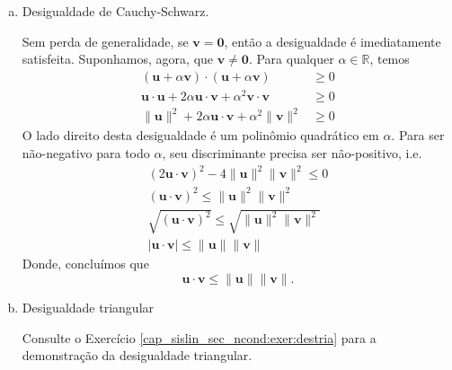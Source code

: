 \begin{dem}
\begin{enumerate}[a)]
  \item Desigualdade de Cauchy-Schwarz.

    Sem perda de generalidade, se $\pmb{v} = \pmb{0}$, então a desigualdade é imediatamente satisfeita. Suponhamos, agora, que $\pmb{v}\neq\pmb{0}$. Para qualquer $\alpha\in\mathbb{R}$, temos
    \begin{align}
      (\pmb{u}+\alpha\pmb{v})\cdot(\pmb{u}+\alpha\pmb{v}) &\geq 0\\
      \pmb{u}\cdot\pmb{u} + 2\alpha\pmb{u}\cdot\pmb{v} + \alpha^2\pmb{v}\cdot\pmb{v} &\geq 0\\
      \|\pmb{u}\|^2 + 2\alpha\pmb{u}\cdot\pmb{v} + \alpha^2\|\pmb{v}\|^2 &\geq 0
    \end{align}
    O lado direito desta desigualdade é um polinômio quadrático em $\alpha$. Para ser não-negativo para todo $\alpha$, seu discriminante precisa ser não-positivo, i.e.
    \begin{gather}
      (2\pmb{u}\cdot\pmb{v})^2 - 4\|\pmb{u}\|^2\|\pmb{v}\|^2 \leq 0\\
      (\pmb{u}\cdot\pmb{v})^2 \leq \|\pmb{u}\|^2\|\pmb{v}\|^2\\
      \sqrt{(\pmb{u}\cdot\pmb{v})^2} \leq \sqrt{\|\pmb{u}\|^2\|\pmb{v}\|^2}\\
      |\pmb{u}\cdot\pmb{v}| \leq \|\pmb{u}\|\|\pmb{v}\|
    \end{gather}
    Donde, concluímos que
    \begin{equation}
      \pmb{u}\cdot\pmb{v} \leq \|\pmb{u}\|\|\pmb{v}\|.
    \end{equation}

  \item Desigualdade triangular

    Consulte o Exercício \ref{cap_sislin_sec_ncond:exer:destria} para a demonstração da desigualdade triangular.
  \end{enumerate}
\end{dem}

